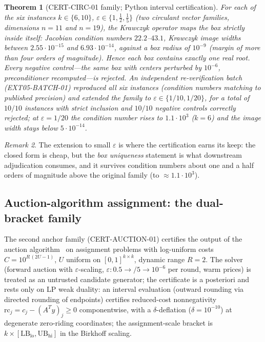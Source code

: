 \documentclass[11pt]{article}
\newtheorem{theorem}{Theorem}[section]
\theoremstyle{definition}
\theoremstyle{remark}
\newtheorem{remark}[theorem]{Remark}
\begin{document}
\begin{theorem}[CERT-CIRC-01 family; Python interval certification]
\label{thm:circ}
For each of the six instances $k\in\{6,10\}$,
$\varepsilon\in\{1,\tfrac12,\tfrac15\}$ (two circulant vector families,
dimensions $n=11$ and $n=19$), the Krawczyk operator maps the box strictly
inside itself: Jacobian condition numbers $22.2$--$43.1$, Krawczyk image
widths between $2.55\cdot10^{-15}$ and $6.93\cdot10^{-14}$, against a box
radius of $10^{-9}$ (margin of more than four orders of magnitude). Hence each
box contains exactly one real root. Every negative control---the same box
with centers perturbed by $10^{-6}$, preconditioner recomputed---is rejected.
An independent re-verification batch (EXT05-BATCH-01) reproduced all six
instances (condition numbers matching to published precision) and extended
the family to $\varepsilon\in\{1/10,1/20\}$, for a total of $10/10$
instances with strict inclusion and $10/10$ negative controls correctly
rejected; at $\varepsilon=1/20$ the condition number rises to
$1.1\cdot10^{3}$ ($k=6$) and the image width stays below $5\cdot10^{-14}$.
\end{theorem}

\begin{remark}
The extension to small $\varepsilon$ is where the certification earns its
keep: the closed form is cheap, but the \emph{box uniqueness} statement is
what downstream adjudication consumes, and it survives condition numbers
about one and a half orders of magnitude above the original family
(to $\approx 1.1\cdot 10^{3}$).
\end{remark}

\subsection{Auction-algorithm assignment: the dual-bracket family}
\label{sec:auction}

The second anchor family (CERT-AUCTION-01) certifies the output of the
auction algorithm~\cite{bertsekas1988} on assignment problems with
log-uniform costs $C=10^{R\,(2U-1)}$, $U$ uniform on $[0,1]^{k\times k}$,
dynamic range $R=2$. The solver (forward auction with
$\varepsilon$-scaling, $\varepsilon: 0.5\to/5\to 10^{-6}$ per round, warm
prices) is treated as an untrusted candidate generator; the certificate is a
posteriori and rests only on LP weak duality: an interval evaluation (outward
rounding via directed rounding of endpoints) certifies reduced-cost
nonnegativity $\mathrm{rc}_j = c_j - (A^{T}y)_j \ge 0$ componentwise, with a
$\delta$-deflation ($\delta=10^{-10}$) at degenerate zero-riding coordinates;
the assignment-scale bracket is $k\times[\mathrm{LB}_{\mathrm{lo}},
\mathrm{UB}_{\mathrm{hi}}]$ in the Birkhoff scaling.
\end{document}
